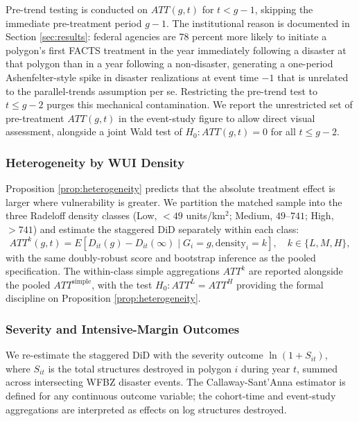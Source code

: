 \documentclass[12pt, letterpaper]{article}
\begin{document}
Pre-trend testing is conducted on $ATT(g, t)$ for $t < g - 1$, skipping the immediate pre-treatment period $g - 1$. The institutional reason is documented in Section \ref{sec:results}: federal agencies are 78 percent more likely to initiate a polygon's first FACTS treatment in the year immediately following a disaster at that polygon than in a year following a non-disaster, generating a one-period Ashenfelter-style spike in disaster realizations at event time $-1$ that is unrelated to the parallel-trends assumption per se. Restricting the pre-trend test to $t \leq g - 2$ purges this mechanical contamination. We report the unrestricted set of pre-treatment $ATT(g, t)$ in the event-study figure to allow direct visual assessment, alongside a joint Wald test of $H_0: ATT(g, t) = 0$ for all $t \leq g - 2$.

\subsubsection{Heterogeneity by WUI Density}

Proposition \ref{prop:heterogeneity} predicts that the absolute treatment effect is larger where vulnerability is greater. We partition the matched sample into the three Radeloff density classes (Low, $< 49$ units/km$^2$; Medium, $49$--$741$; High, $> 741$) and estimate the staggered DiD separately within each class:
\begin{equation}
ATT^k(g, t) = E\!\left[D_{it}(g) - D_{it}(\infty) \mid G_i = g, \mathrm{density}_i = k\right], \quad k \in \{L, M, H\},
\label{eq:hetero_att}
\end{equation}
with the same doubly-robust score and bootstrap inference as the pooled specification. The within-class simple aggregations $ATT^k$ are reported alongside the pooled $ATT^{\text{simple}}$, with the test $H_0: ATT^L = ATT^H$ providing the formal discipline on Proposition \ref{prop:heterogeneity}.

\subsubsection{Severity and Intensive-Margin Outcomes}

We re-estimate the staggered DiD with the severity outcome $\ln(1 + S_{it})$, where $S_{it}$ is the total structures destroyed in polygon $i$ during year $t$, summed across intersecting WFBZ disaster events. The Callaway-Sant'Anna estimator is defined for any continuous outcome variable; the cohort-time and event-study aggregations are interpreted as effects on log structures destroyed.
\end{document}
